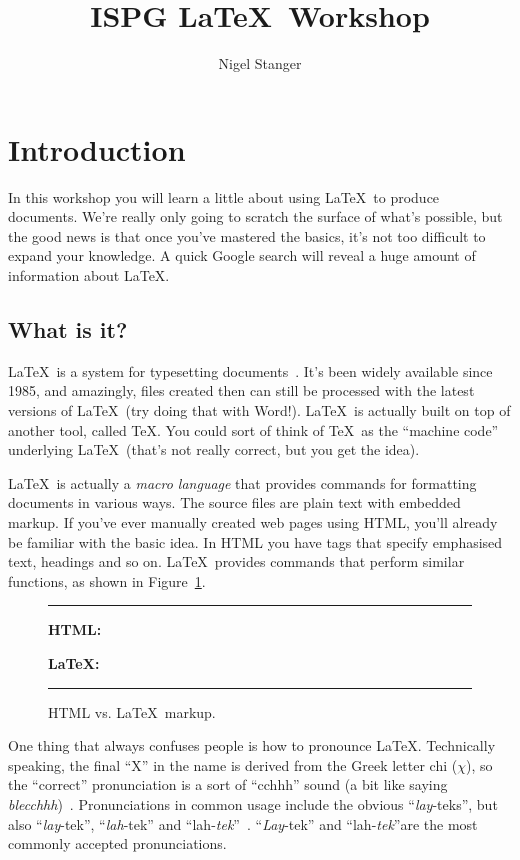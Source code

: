 \documentclass[11pt,a4paper]{article}
\title{ISPG \LaTeX\ Workshop}
\author{Nigel Stanger}
\begin{document}
\maketitle


\section{Introduction}
\label{sec:intro}

In this workshop you will learn a little about using \LaTeX\ to produce
documents. We're really only going to scratch the surface of what's
possible, but the good news is that once you've mastered the basics,
it's not too difficult to expand your knowledge. A quick Google search
will reveal a huge amount of information about \LaTeX.


\subsection{What is it?}
\label{sec:what}

\LaTeX\ is a system for typesetting documents~\cite{UsersGuide}. It's
been widely available since 1985, and amazingly, files created then can
still be processed with the latest versions of \LaTeX\ (try doing that
with Word!). \LaTeX\ is actually built on top of another tool, called
\TeX. You could sort of think of \TeX\ as the ``machine code''
underlying \LaTeX\ (that's not really correct, but you get the idea).

\LaTeX\ is actually a \emph{macro language} that provides commands for
formatting documents in various ways. The source files are plain text
with embedded markup. If you've ever manually created web pages using
HTML, you'll already be familiar with the basic idea. In HTML you have
tags that specify emphasised text, headings and so on. \LaTeX\ provides
commands that perform similar functions, as shown in
Figure~\ref{fig:HTMLcomparison}.

\begin{figure}
	\hrule\medskip
	\textbf{HTML:}

	\bigskip
	
	\textbf{\LaTeX:}

	\hrule
	\caption{HTML vs. \LaTeX\ markup.}
	\label{fig:HTMLcomparison}
\end{figure}

One thing that always confuses people is how to pronounce \LaTeX.
Technically speaking, the final ``X'' in the name is derived from the
Greek letter chi ($\chi$), so the ``correct'' pronunciation is a sort of
``cchhh'' sound (a bit like saying \emph{blecchhh})~\cite{TeXBook}.
Pronunciations in common usage include the obvious ``\emph{lay}-teks'',
but also ``\emph{lay}-tek'', ``\emph{lah}-tek'' and
``lah-\emph{tek}''~\cite{UsersGuide}. ``\emph{Lay}-tek''  and
``lah-\emph{tek}''are the most commonly accepted pronunciations.
\end{document}
